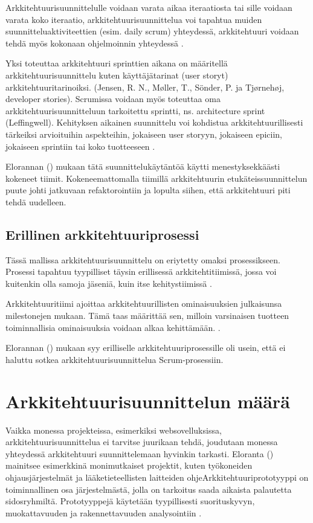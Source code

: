 Arkkitehtuurisuunnittelulle voidaan varata aikaa iteraatiosta tai sille voidaan varata koko iteraatio, arkkitehtuurisuunnittelua voi tapahtua muiden suunnitteluaktiviteettien (esim. daily scrum) yhteydessä, arkkitehtuuri voidaan tehdä myös kokonaan ohjelmoinnin yhteydessä \citep{rost_distilling_2015}. 

Yksi toteuttaa arkkitehtuuri sprinttien aikana on määritellä arkkitehtuurisuunnittelu kuten käyttäjätarinat (user storyt) arkkitehtuuritarinoiksi. (Jensen, R. N., Møller, T., Sönder, P. ja Tjørnehøj, developer stories). Scrumissa voidaan myös toteuttaa oma arkkitehtuurisuunnitteluun tarkoitettu sprintti, ns. architecture sprint (Leffingwell). Kehityksen aikainen suunnittelu voi kohdistua arkkitehtuurillisesti tärkeiksi arvioituihin  aspekteihin, jokaiseen user storyyn, jokaiseen epiciin, jokaiseen sprintiin tai koko tuotteeseen \citep{rost_distilling_2015}.

Elorannan (\citeyear{eloranta2015techniques}) mukaan tätä suunnittelukäytäntöä käytti menestyksekkäästi kokeneet tiimit. Kokeneemattomalla tiimillä arkkitehtuurin etukäteissuunnittelun puute johti jatkuvaan refaktorointiin ja lopulta siihen, että arkkitehtuuri piti tehdä uudelleen.


\section{Erillinen arkkitehtuuriprosessi}
Tässä mallissa arkkitehtuurisuunnittelu on eriytetty omaksi prosessikseen. Prosessi tapahtuu tyypilliset täysin erillisessä arkkitehtitiimissä, jossa voi kuitenkin olla samoja jäseniä, kuin itse kehitystiimissä \citep{eloranta2015techniques}.

Arkkitehtuuritiimi ajoittaa arkkitehtuurillisten ominaisuuksien julkaisunsa milestonejen mukaan. Tämä taas määrittää sen, milloin varsinaisen tuotteen toiminnallisia ominaisuuksia voidaan alkaa kehittämään. \citep{eloranta2015techniques}.

Elorannan (\citeyear{eloranta2015techniques}) mukaan syy erilliselle arkkitehtuuriprosessille oli usein, että ei haluttu sotkea arkkitehtuurisuunnittelua Scrum-prosessiin.

\chapter{Arkkitehtuurisuunnittelun määrä}

Vaikka monessa projekteissa, esimerkiksi websovelluksissa, arkkitehtuurisuunnittelua ei tarvitse juurikaan tehdä, joudutaan monessa yhteydessä arkkitehtuuri suunnittelemaan hyvinkin tarkasti. Eloranta (\citeyear{eloranta2015techniques}) mainitsee esimerkkinä monimutkaiset projektit, kuten työkoneiden ohjausjärjestelmät ja lääketieteellisten laitteiden ohjeArkkitehtuuriprototyyppi on toiminnallinen osa järjestelmästä, jolla on tarkoitus saada aikaista palautetta sidosryhmiltä. Prototyyppejä käytetään tyypillisesti suorituskyvyn, muokattavuuden ja rakennettavuuden analysointiin \citep{babar_agile_2013}. 

